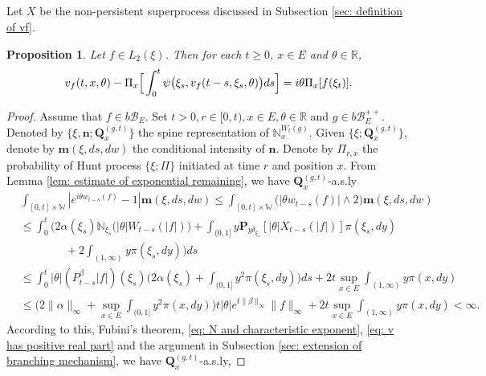 \documentclass[12pt, a4paper]{amsart}
\newtheorem{prop}[thm]{Proposition}
\theoremstyle{definition}
\numberwithin{equation}{section}
\begin{document}
\subsection{}
    Let $X$ be the non-persistent superprocess discussed in Subsection \ref{sec: definition of vf}.
\begin{prop}
	Let $f\in L_2(\xi)$. Then for each $t\geq 0$, $x\in E$ and $\theta \in \mathbb R$,
\begin{equation}
\label{eq: complex FKPP-equation}
	v_f(t,x,\theta) - \Pi_{x} \Big[\int_0^t \psi\big(\xi_s,v_f(t-s,\xi_s,\theta)\big) ds \Big]
	\\= i\theta \Pi_{x} [f(\xi_t)].
\end{equation}
\end{prop}
\begin{proof}
    Assume that $f\in b\mathscr B_E$.
	Set $t>0, r\in [0,t), x\in E, \theta \in \mathbb R$ and $g\in b\mathscr B_E^{++}$.
	Denoted by $\{\xi, \mathbf n; \mathbf Q_x^{(g,t)}\}$ the spine representation of $\mathbb N_x^{W_t(g)}$.
    Given $\{\xi; \mathbf Q_x^{(g,t)}\}$, denote by $\mathbf m(\xi, ds,dw)$ the conditional intensity of $\mathbf n$.
    Denote by $\Pi_{r,x}$ the probability of Hunt process $\{\xi; \Pi\}$ initiated at time $r$ and position $x$.
    From Lemma \ref{lem: estimate of exponential remaining}, we have $\mathbf Q^{(g,t)}_{x}$-a.s.ly
\begin{align}
&\int_{[0,t]\times \mathbb W}|e^{i\theta w_{t-s}(f)} - 1| \mathbf m(\xi, ds,dw)
    \leq \int_{[0,t]\times \mathbb W}\big(|\theta w_{t-s}(f)| \wedge 2\big) \mathbf m(\xi, ds,dw)
    \\&\leq \int_0^t \Big(2\alpha(\xi_s)\mathbb N_{\xi_s}\big(|\theta | W_{t-s}(|f|)\big)  + \int_{(0,1]} y \mathbf P_{y \delta_{\xi_s}}[|\theta| X_{t-s}(|f|)] \pi(\xi_s,dy) 
    \\&\qquad\qquad+ 2\int_{(1,\infty)}y\pi(\xi_s,dy)\Big) ds
     \\&\leq \int_0^t |\theta|(P_{t-s}^\beta |f|)(\xi_s)\Big(2\alpha(\xi_s)  + \int_{(0,1]} y^2 \pi(\xi_s,dy)\Big) ds + 2t \sup_{x\in E}\int_{(1,\infty)}y\pi(x,dy)
    \\&\leq \Big(2\|\alpha\|_\infty +\sup_{x\in E}\int_{(0,1]} y^2 \pi(x,dy)\Big) t |\theta| e^{t\|\beta\|_\infty}\|f\|_\infty + 2t \sup_{x\in E}\int_{(1,\infty)}y\pi(x,dy)
    < \infty.
\end{align}
    According to this, Fubini's theorem, \eqref{eq: N and characteristic exponent}, \eqref{eq: v has positive real part} and the argument in Subsection \ref{sec: extension of branching mechanism}, we have $\mathbf Q^{(g,t)}_{x}$-a.s.ly,

\end{proof}
\end{document}
